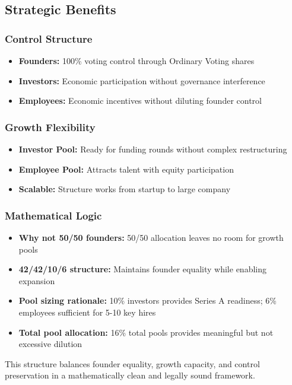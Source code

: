 \subsection*{Strategic Benefits}

\subsubsection*{Control Structure}
\begin{itemize}
    \item \textbf{Founders:} 100\% voting control through Ordinary Voting shares
    \item \textbf{Investors:} Economic participation without governance interference
    \item \textbf{Employees:} Economic incentives without diluting founder control
\end{itemize}

\subsubsection*{Growth Flexibility}
\begin{itemize}
    \item \textbf{Investor Pool:} Ready for funding rounds without complex restructuring
    \item \textbf{Employee Pool:} Attracts talent with equity participation
    \item \textbf{Scalable:} Structure works from startup to large company
\end{itemize}

\subsubsection*{Mathematical Logic}
\begin{itemize}
    \item \textbf{Why not 50/50 founders:} 50/50 allocation leaves no room for growth pools
    \item \textbf{42/42/10/6 structure:} Maintains founder equality while enabling expansion
    \item \textbf{Pool sizing rationale:} 10\% investors provides Series A readiness; 6\% employees sufficient for 5-10 key hires
    \item \textbf{Total pool allocation:} 16\% total pools provides meaningful but not excessive dilution
\end{itemize}

This structure balances founder equality, growth capacity, and control preservation in a mathematically clean and legally sound framework.


